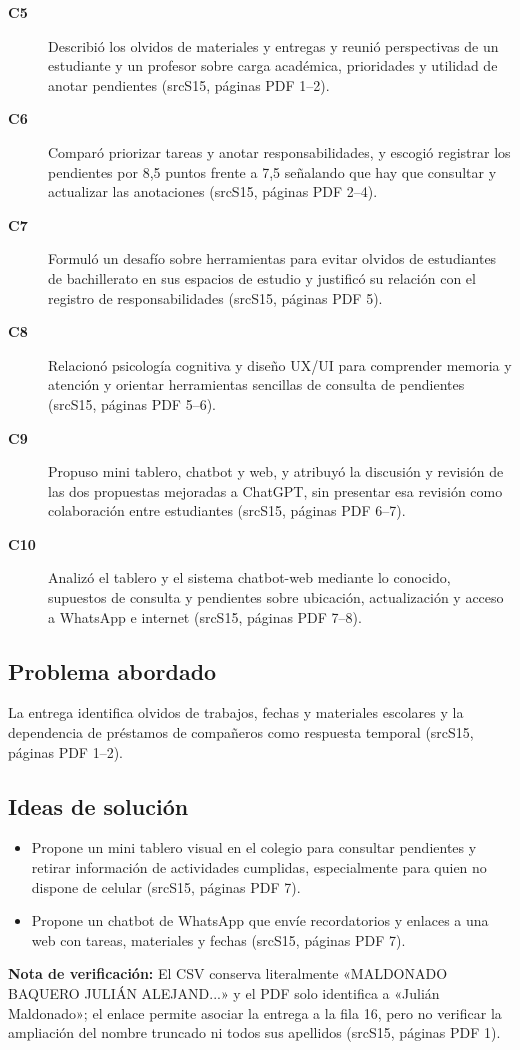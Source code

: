 \documentclass[11pt,a4paper]{article}
\newcommand{\evid}[2]{(\csname src#1\endcsname, páginas PDF #2)}
\begin{document}
\begin{description}
\item[\textbf{C5}] Describió los olvidos de materiales y entregas y reunió perspectivas de un estudiante y un profesor sobre carga académica, prioridades y utilidad de anotar pendientes \evid{S15}{1--2}.
\item[\textbf{C6}] Comparó priorizar tareas y anotar responsabilidades, y escogió registrar los pendientes por 8,5 puntos frente a 7,5 señalando que hay que consultar y actualizar las anotaciones \evid{S15}{2--4}.
\item[\textbf{C7}] Formuló un desafío sobre herramientas para evitar olvidos de estudiantes de bachillerato en sus espacios de estudio y justificó su relación con el registro de responsabilidades \evid{S15}{5}.
\item[\textbf{C8}] Relacionó psicología cognitiva y diseño UX/UI para comprender memoria y atención y orientar herramientas sencillas de consulta de pendientes \evid{S15}{5--6}.
\item[\textbf{C9}] Propuso mini tablero, chatbot y web, y atribuyó la discusión y revisión de las dos propuestas mejoradas a ChatGPT, sin presentar esa revisión como colaboración entre estudiantes \evid{S15}{6--7}.
\item[\textbf{C10}] Analizó el tablero y el sistema chatbot-web mediante lo conocido, supuestos de consulta y pendientes sobre ubicación, actualización y acceso a WhatsApp e internet \evid{S15}{7--8}.
\end{description}
\subsection*{Problema abordado}
La entrega identifica olvidos de trabajos, fechas y materiales escolares y la dependencia de préstamos de compañeros como respuesta temporal \evid{S15}{1--2}.
\subsection*{Ideas de solución}
\begin{itemize}
\item Propone un mini tablero visual en el colegio para consultar pendientes y retirar información de actividades cumplidas, especialmente para quien no dispone de celular \evid{S15}{7}.
\item Propone un chatbot de WhatsApp que envíe recordatorios y enlaces a una web con tareas, materiales y fechas \evid{S15}{7}.
\end{itemize}
{\small\textbf{Nota de verificación:} El CSV conserva literalmente «MALDONADO BAQUERO JULIÁN ALEJAND...» y el PDF solo identifica a «Julián Maldonado»; el enlace permite asociar la entrega a la fila 16, pero no verificar la ampliación del nombre truncado ni todos sus apellidos \evid{S15}{1}.}
\clearpage
\end{document}
